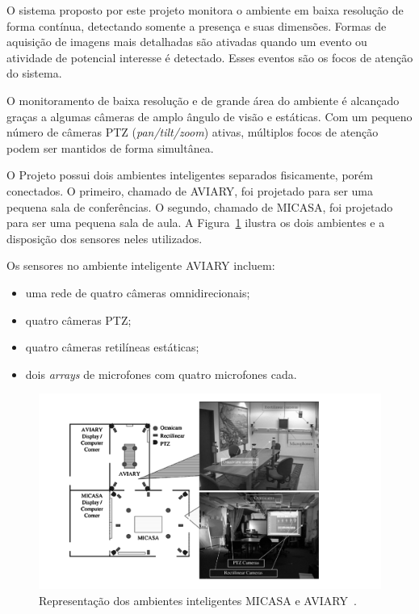 O sistema proposto por este projeto monitora o ambiente em baixa resolução de forma contínua, detectando somente a presença e suas dimensões. Formas de aquisição de imagens mais detalhadas são ativadas quando um evento ou atividade de potencial interesse é detectado. Esses eventos são os focos de atenção do sistema.

O monitoramento de baixa resolução e de grande área do ambiente é alcançado graças a algumas câmeras de amplo ângulo de visão e estáticas. Com um pequeno número de câmeras PTZ (\textit{pan/tilt/zoom}) ativas, múltiplos focos de atenção podem ser mantidos de forma simultânea.

O Projeto possui dois ambientes inteligentes separados fisicamente, porém conectados. O primeiro, chamado de AVIARY, foi projetado para ser uma pequena sala de conferências. O segundo, chamado de MICASA, foi projetado para ser uma pequena sala de aula. A Figura~\ref{micasa_aviary} ilustra os dois ambientes e a disposição dos sensores neles utilizados.

Os sensores no ambiente inteligente AVIARY incluem:

	\begin{itemize}
		\item uma rede de quatro câmeras omnidirecionais;
		\item quatro câmeras PTZ;
		\item quatro câmeras retilíneas estáticas;
		\item dois \textit{arrays} de microfones com quatro microfones cada.
	\end{itemize}

\begin{figure}[hbt]
		\begin{center}
	\includegraphics[scale=0.5]{figuras/3.TrabalhosCorrelatos/micasa_aviary.png}
		\end{center}
		\caption{Representação dos ambientes inteligentes MICASA e AVIARY~\cite{trivedi}.}
		\label{micasa_aviary}
	\end{figure}

